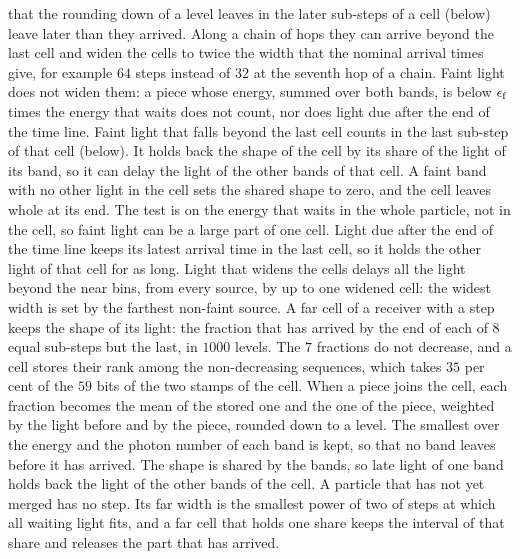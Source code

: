that the rounding down of a level leaves in the later sub-steps of a cell (below)
leave later than they arrived. Along a chain of hops they can arrive beyond the
last cell and widen the cells to twice the width that the nominal arrival times
give, for example $64$ steps instead of $32$ at the seventh hop of a chain. Faint light does
not widen them: a piece whose energy, summed over both bands, is below
$\epsilon_{\rm f}$ times the energy that waits does not count, nor does light
due after the end of the time line. Faint light that falls beyond the last
cell counts in the last sub-step of that cell (below). It holds back the shape
of the cell by its share of the light of its band, so it can delay
the light of the other bands of that cell. A faint band with no other light in
the cell sets the shared shape to zero, and the cell leaves whole at its end.
The test is on the energy that waits in the whole particle, not in the cell, so
faint light can be a large part of one cell. Light due after the end of the time line keeps its
latest arrival time in the last cell, so it holds the other light of that cell
for as long. Light that widens the cells delays all the light
beyond the near bins, from every source, by up to one widened cell: the widest
width is set by the farthest non-faint source. A far cell of a receiver with a step keeps the shape of its light: the fraction
that has arrived by the end of each of $8$ equal sub-steps but the last, in
$1000$ levels. The $7$ fractions do not decrease, and a cell stores their rank
among the non-decreasing sequences, which takes $35$ per cent of the $59$ bits
of the two stamps of the cell. When a piece joins the cell, each fraction becomes
the mean of the stored one and the one of the piece, weighted by the light before
and by the piece, rounded down to a level. The smallest over the energy and the
photon number of each band is kept, so that no band leaves before it has
arrived. The shape is shared by the bands, so late light of one band holds back
the light of the other bands of the cell.
A particle that has not yet merged has no step. Its far width is the smallest power of two of steps at which all
waiting light fits, and a far cell that holds one share keeps the interval of
that share and releases the part that has arrived.

